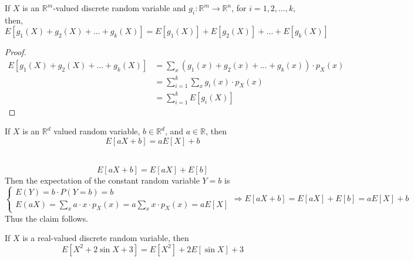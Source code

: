 \begin{theorem}
    If $X$ is an $\mathbb{R}^m$-valued discrete random variable and $g_i :
\mathbb{R}^m \rightarrow \mathbb{R}^n$, for $i = 1, 2, \dots, k$, then,
\begin{equation*}
    E[g_1(X) + g_2(X) + \dots + g_k(X)]
    = E[g_1(X)] + E[g_2(X)] + \dots + E[g_k(X)]
\end{equation*}
\end{theorem}
\begin{proof}
    \begin{align*}
           E[g_1(X) + g_2(X) + \dots + g_k(X)]
        &= \sum_{x} (g_1(x) + g_2(x) + \dots + g_k(x)) \cdot p_X(x)          \\
        &= \sum_{i = 1}^k \sum_{x} g_i(x) \cdot p_X(x)                       \\
        &= \sum_{i = 1}^k E[g_i(X)]
    \end{align*}
\end{proof}

\begin{theorem}
    If $X$ is an $\mathbb{R}^d$ valued random variable, $b \in \mathbb{R}^d$,
and $a \in \mathbb{R}$, then 
\begin{equation*}
    E[aX + b] = aE[X] + b
\end{equation*}
\end{theorem}
\begin{solution} \quad                                                       \\
    \begin{equation*}
        E[aX+b] = E[aX] + E[b]
    \end{equation*}
    Then the expectation of the constant random variable $Y = b$ is 
    \begin{equation*}
        \begin{cases}
            E(Y) = b \cdot P(Y = b) = b                                      \\
            E(aX) = \sum_{x} a \cdot x \cdot p_X(x) 
                  = a \sum_{x} x \cdot p_X(x)
                  = a E[X]
        \end{cases}
        \Rightarrow
        E[aX + b] = E[aX] + E[b] = aE[X] + b
    \end{equation*}
    Thus the claim follows.
\end{solution}

\begin{example}
    If $X$ is a real-valued discrete random variable, then
    \begin{equation*}
          E[X^2 + 2 \sin{X} + 3]
        = E[X^2] + 2 E[\sin{X}] + 3
    \end{equation*}
\end{example}

